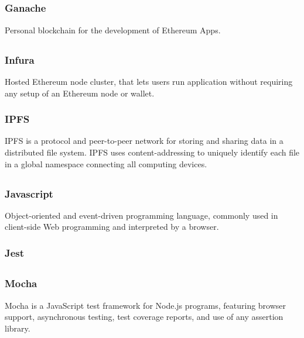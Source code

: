 	\subsection*{}
		\subsubsection*{Ganache}
			Personal blockchain for the development of Ethereum \DJ{}Apps.
	
	\subsection*{}
		\subsubsection*{Infura}
			Hosted Ethereum node cluster, that lets users run application without requiring any setup of an Ethereum node or wallet.
		\subsubsection*{IPFS}
			IPFS is a protocol and peer-to-peer network for storing and sharing data in a distributed file system. IPFS uses content-addressing to uniquely identify each file in a global namespace connecting all computing devices. 
	
	\subsection*{}
		\subsubsection*{Javascript}
			Object-oriented and event-driven programming language, commonly used in client-side Web programming and interpreted by a browser.
		\subsubsection*{Jest}
	
	\subsection*{}
		\subsubsection*{Mocha}
			Mocha is a JavaScript test framework for Node.js programs, featuring browser support, asynchronous testing, test coverage reports, and use of any assertion library.
	
